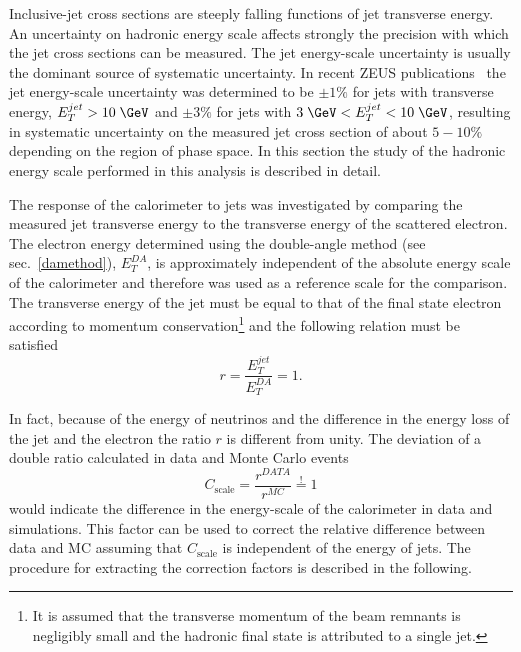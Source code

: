 Inclusive-jet cross sections are steeply falling functions of jet transverse energy. An uncertainty on hadronic energy scale affects strongly the precision with which the jet cross sections can be measured. The jet energy-scale uncertainty is usually the dominant source of systematic uncertainty. In recent ZEUS publications~\cite{epj:c70:965, np:b864:1} the jet energy-scale uncertainty was determined to be $\pm 1\%$ for jets with transverse energy, $\etjet>10\; \GeV$ and $\pm 3\%$ for jets with $3\; \GeV<\etjet < 10\; \GeV$, resulting in systematic uncertainty on the measured jet cross section of about $5-10\%$ depending on the region of phase space. In this section the study of the hadronic energy scale performed in this analysis is described in detail.

The response of the calorimeter to jets was investigated by comparing the measured jet transverse energy to the transverse energy of the scattered electron. The electron energy determined using the double-angle method (see sec.~\ref{damethod}), $E_T^{DA}$, is approximately independent of the absolute energy scale of the calorimeter and therefore was used as a reference scale for the comparison. The transverse energy of the jet must be equal to that of the final state electron according to momentum conservation\footnote{It is assumed that the transverse momentum of the beam remnants is negligibly small and the hadronic final state is attributed to a single jet.} and the following relation must be satisfied
\begin{equation}
r = \frac{E_T^{jet}}{E_T^{DA}} = 1.
\label{eq:etjetetelbalance}
\end{equation}

In fact, because of the energy of neutrinos and the difference in the energy loss of the jet and the electron the ratio $r$ is different from unity. The deviation of a double ratio calculated in data and Monte Carlo events
\begin{equation}
C_\text{scale} = \frac{r^{DATA}}{r^{MC}} \stackrel{!}{=} 1
\label{eq:cscale}
\end{equation}
would indicate the difference in the energy-scale of the calorimeter in data and simulations. This factor can be used to correct the relative difference between data and MC assuming that $C_\text{scale}$ is independent of the energy of jets. The procedure for extracting the correction factors is described in the following.

